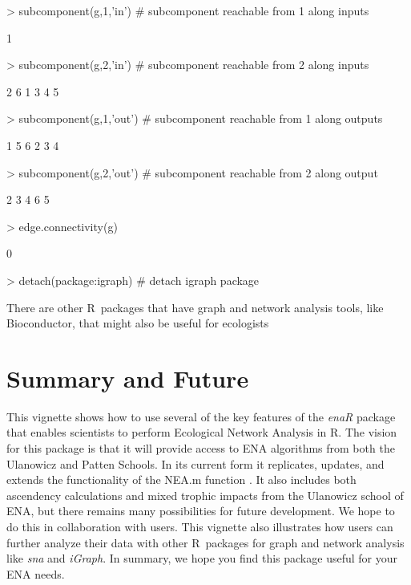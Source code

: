 \documentclass[11pt]{article}
\def\R{\textsf{R}}
\begin{document}
\begin{Schunk}
\begin{Sinput}
> subcomponent(g,1,'in')  # subcomponent reachable from 1 along inputs
\end{Sinput}
\begin{Soutput}
[1] 1
\end{Soutput}
\begin{Sinput}
> subcomponent(g,2,'in')  # subcomponent reachable from 2 along inputs
\end{Sinput}
\begin{Soutput}
[1] 2 6 1 3 4 5
\end{Soutput}
\begin{Sinput}
> subcomponent(g,1,'out') # subcomponent reachable from 1 along outputs
\end{Sinput}
\begin{Soutput}
[1] 1 5 6 2 3 4
\end{Soutput}
\begin{Sinput}
> subcomponent(g,2,'out') # subcomponent reachable from 2 along output
\end{Sinput}
\begin{Soutput}
[1] 2 3 4 6 5
\end{Soutput}
\begin{Sinput}
> edge.connectivity(g)
\end{Sinput}
\begin{Soutput}
[1] 0
\end{Soutput}
\begin{Sinput}
> detach(package:igraph)  # detach igraph package
\end{Sinput}
\end{Schunk}



There are other \R\ packages that have graph and network analysis tools,
like Bioconductor, that might also be useful for ecologists


\section{Summary and Future}
This vignette shows how to use several of the key features of the
\textit{enaR} package that enables scientists to perform Ecological
Network Analysis in \R.  The vision for this package is that it will
provide access to ENA algorithms from both the Ulanowicz and Patten
Schools.  In its current form it replicates, updates, and extends the
functionality of the NEA.m function \citep{fath06}.  It also includes
both ascendency calculations and mixed trophic impacts from the
Ulanowicz school of ENA, but there remains many possibilities for
future development.  We hope to do this in collaboration with
users. This vignette also illustrates how users can further analyze
their data with other \R\ packages for graph and network analysis like
\textit{sna} and \textit{iGraph}.  In summary, we hope you find this
package useful for your ENA needs.  


\end{document}
